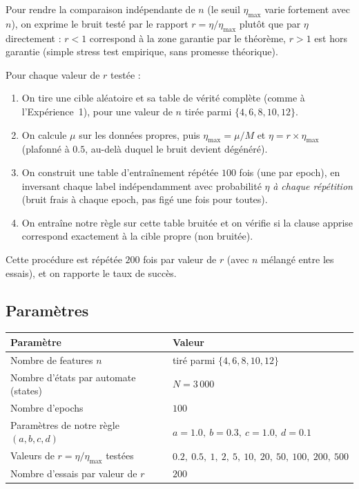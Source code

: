 \documentclass[11pt]{article}
\begin{document}
Pour rendre la comparaison indépendante de $n$ (le seuil $\eta_{\max}$
varie fortement avec $n$), on exprime le bruit testé par le rapport
$r=\eta/\eta_{\max}$ plutôt que par $\eta$ directement : $r<1$ correspond
à la zone garantie par le théorème, $r>1$ est hors garantie (simple
stress test empirique, sans promesse théorique).

Pour chaque valeur de $r$ testée :
\begin{enumerate}
\item On tire une cible aléatoire et sa table de vérité complète (comme
à l'Expérience~1), pour une valeur de $n$ tirée parmi $\{4,6,8,10,12\}$.
\item On calcule $\mu$ sur les données propres, puis
$\eta_{\max}=\mu/M$ et $\eta = r\times\eta_{\max}$ (plafonné à $0.5$,
au-delà duquel le bruit devient dégénéré).
\item On construit une table d'entraînement répétée $100$ fois (une par
epoch), en inversant chaque label indépendamment avec probabilité
$\eta$ \emph{à chaque répétition} (bruit frais à chaque epoch, pas figé
une fois pour toutes).
\item On entraîne notre règle sur cette table bruitée et on vérifie si
la clause apprise correspond exactement à la cible propre (non
bruitée).
\end{enumerate}
Cette procédure est répétée $200$ fois par valeur de $r$ (avec $n$
mélangé entre les essais), et on rapporte le taux de succès.

\subsection{Paramètres}

\begin{center}
\begin{tabular}{ll}
\toprule
Paramètre & Valeur \\
\midrule
Nombre de features $n$ & tiré parmi $\{4,6,8,10,12\}$ \\
Nombre d'états par automate (states) & $N=3\,000$ \\
Nombre d'epochs & $100$ \\
Paramètres de notre règle $(a,b,c,d)$ & $a=1.0,\ b=0.3,\ c=1.0,\ d=0.1$ \\
Valeurs de $r=\eta/\eta_{\max}$ testées & $0.2,\ 0.5,\ 1,\ 2,\ 5,\ 10,\ 20,\ 50,\ 100,\ 200,\ 500$ \\
Nombre d'essais par valeur de $r$ & $200$ \\
\bottomrule
\end{tabular}
\end{center}
\end{document}
